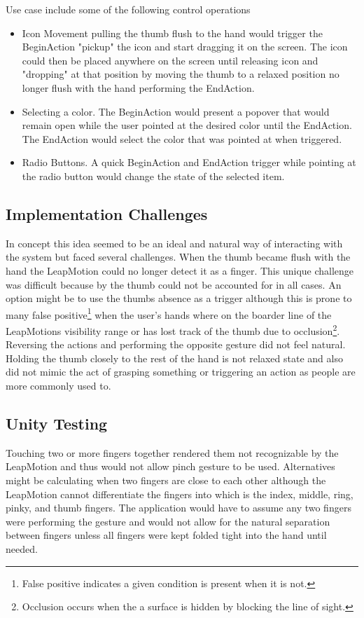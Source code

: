 Use case include some of the following control operations

\begin{itemize}
\item Icon Movement pulling the thumb flush to the hand would trigger the BeginAction "pickup" the icon and start dragging it on the screen. The icon could then be placed anywhere on the screen until releasing icon and "dropping" at that position by moving the thumb to a relaxed position no longer flush with the hand performing the EndAction.
\item Selecting a color. The BeginAction would present a popover that would remain open while the user pointed at the desired color until the EndAction. The EndAction would select the color that was pointed at when triggered. 
\item Radio Buttons. A quick BeginAction and EndAction trigger while pointing at the radio button would change the state of the selected item. 
\end{itemize}

\subsection{Implementation Challenges}
In concept this idea seemed to be an ideal and natural way of interacting with the system but faced several challenges. When the thumb became flush with the hand the LeapMotion could no longer detect it as a finger. This unique challenge was difficult because by the thumb could not be accounted for in all cases. An option might be to use the thumbs absence as a trigger although this is prone to many false positive\footnote{False positive indicates a given condition is present when it is not.} when the user's hands where on the boarder line of the LeapMotions visibility range or has lost track of the thumb due to occlusion\footnote{Occlusion occurs when the a surface is hidden by blocking the line of sight.}. Reversing the actions and performing the opposite gesture did not feel natural. Holding the thumb closely to the rest of the hand is not relaxed state and also did not mimic the act of grasping something or triggering an action as people are more commonly used to. 


\subsection{Unity Testing}
Touching two or more fingers together rendered them not recognizable by the LeapMotion and thus would not allow pinch gesture to be used. Alternatives might be calculating when two fingers are close to each other although the LeapMotion cannot differentiate the fingers into which is the index, middle, ring, pinky, and thumb fingers. The application would have to assume any two fingers were performing the gesture and would not allow for the natural separation between fingers unless all fingers were kept folded tight into the hand until needed. 

